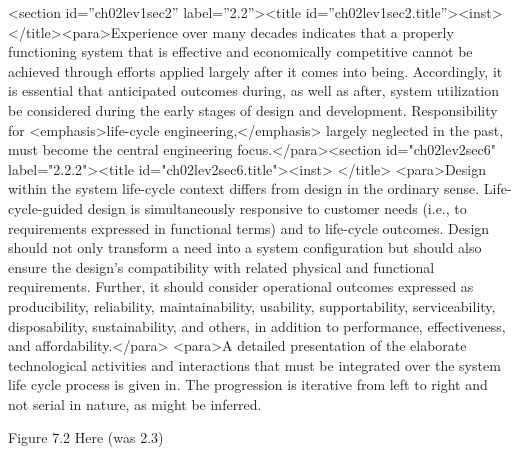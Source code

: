 <section id=”ch02lev1sec2” label=”2.2”><title id=”ch02lev1sec2.title”><inst> </title><para>Experience over many decades indicates that a properly functioning system that is effective and economically competitive cannot be achieved through efforts applied largely after it comes into being. Accordingly, it is essential that anticipated outcomes during, as well as after, system utilization be considered during the early stages of design and development. Responsibility for <emphasis>life-cycle engineering,</emphasis> largely neglected in the past, must become the central engineering focus.</para><section id="ch02lev2sec6" label="2.2.2"><title id="ch02lev2sec6.title"><inst> </title>
	<para>Design within the system life-cycle context differs from design in the ordinary sense. Life-cycle-guided design is simultaneously responsive to customer needs (i.e., to requirements expressed in functional terms) and to life-cycle outcomes. Design should not only transform a need into a system configuration but should also ensure the design’s compatibility with related physical and functional requirements. Further, it should consider operational outcomes expressed as producibility, reliability, maintainability, usability, supportability, serviceability, disposability, sustainability, and others, in addition to performance, effectiveness, and affordability.</para>
<para>A detailed presentation of the elaborate technological activities and interactions that must be integrated over the system life cycle process is given in. The progression is iterative from left to right and not serial in nature, as might be inferred.

Figure 7.2 Here (was 2.3)

